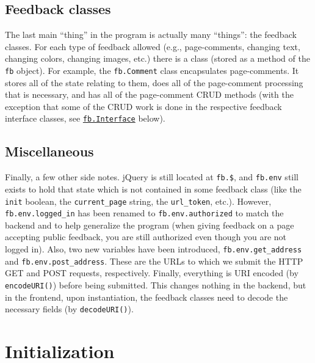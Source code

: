\documentclass[letterpaper,12pt]{article}
\newcommand{\fb}[1]{\texttt{fb#1}}
\newcommand{\code}[1]{{\tt #1}}
\begin{document}
\subsection{Feedback classes}
\label{sec:intro:feedback classes}
The last main ``thing'' in the program is actually many ``things'': the feedback classes.  For each type of feedback allowed (e.g., page-comments, changing text, changing colors, changing images, etc.) there is a class (stored as a method of the \fb{} object).  For example, the \fb{.Comment} class encapsulates page-comments.  It stores all of the state relating to them, does all of the page-comment processing that is necessary, and has all of the page-comment CRUD methods (with the exception that some of the CRUD work is done in the respective feedback interface classes, see \hyperref[sec:fb.Interface]{\fb{.Interface}} below).

\subsection{Miscellaneous}
\label{sec:intro:misc}
Finally, a few other side notes.  jQuery is still located at \fb{.\$}, and \fb{.env} still exists to hold that state which is not contained in some feedback class (like the \code{init} boolean, the \code{current\_page} string, the \code{url\_token}, etc.).  However, \fb{.env.logged\_in} has been renamed to \fb{.env.authorized} to match the backend and to help generalize the program (when giving feedback on a page accepting public feedback, you are still authorized even though you are not logged in).  Also, two new variables have been introduced, \fb{.env.get\_address} and \fb{.env.post\_address}.  These are the URLs to which we submit the HTTP GET and POST requests, respectively.  Finally, everything is URI encoded (by \code{encodeURI()}) before being submitted.  This changes nothing in the backend, but in the frontend, upon instantiation, the feedback classes need to decode the necessary fields (by \code{decodeURI()}).

\newpage

\section{Initialization}
\label{sec:init}
\end{document}
